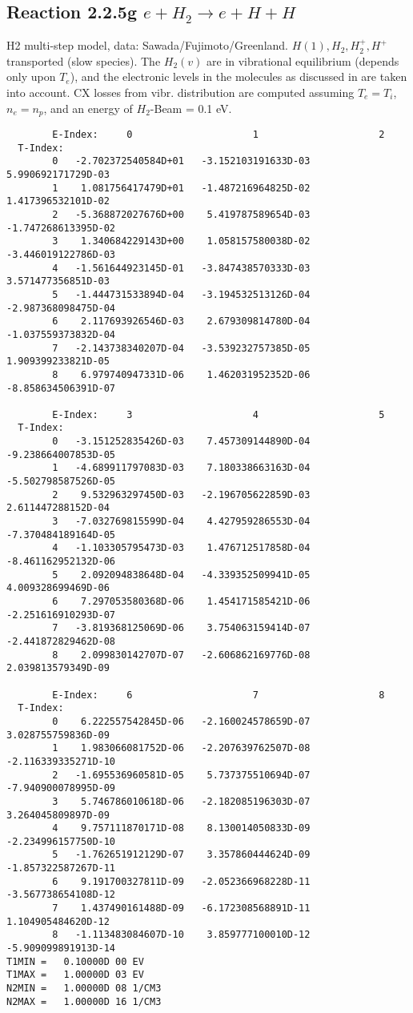 \documentclass[12pt,dvipdfmx]{article}
\begin{document}
\subsection{
Reaction 2.2.5g   $e + H_2   \rightarrow e + H + H  $
}

H2 multi-step model,
data: Sawada/Fujimoto/Greenland.
$  H(1), H_2, H_2^+, H^+ $ transported (slow species).
The $H_2(v)$ are in vibrational equilibrium
(depends only upon $T_e$), and the electronic levels
in the molecules as discussed in \cite{kn:Sawada} are taken into
account. CX losses from vibr. distribution are computed assuming $T_e =
T_i$, $n_e = n_p$, and an energy of $H_2$-Beam  = 0.1 eV.
\begin{small}\begin{verbatim}
        E-Index:     0                     1                     2
  T-Index:
        0   -2.702372540584D+01   -3.152103191633D-03    5.990692171729D-03
        1    1.081756417479D+01   -1.487216964825D-02    1.417396532101D-02
        2   -5.368872027676D+00    5.419787589654D-03   -1.747268613395D-02
        3    1.340684229143D+00    1.058157580038D-02   -3.446019122786D-03
        4   -1.561644923145D-01   -3.847438570333D-03    3.571477356851D-03
        5   -1.444731533894D-04   -3.194532513126D-04   -2.987368098475D-04
        6    2.117693926546D-03    2.679309814780D-04   -1.037559373832D-04
        7   -2.143738340207D-04   -3.539232757385D-05    1.909399233821D-05
        8    6.979740947331D-06    1.462031952352D-06   -8.858634506391D-07

        E-Index:     3                     4                     5
  T-Index:
        0   -3.151252835426D-03    7.457309144890D-04   -9.238664007853D-05
        1   -4.689911797083D-03    7.180338663163D-04   -5.502798587526D-05
        2    9.532963297450D-03   -2.196705622859D-03    2.611447288152D-04
        3   -7.032769815599D-04    4.427959286553D-04   -7.370484189164D-05
        4   -1.103305795473D-03    1.476712517858D-04   -8.461162952132D-06
        5    2.092094838648D-04   -4.339352509941D-05    4.009328699469D-06
        6    7.297053580368D-06    1.454171585421D-06   -2.251616910293D-07
        7   -3.819368125069D-06    3.754063159414D-07   -2.441872829462D-08
        8    2.099830142707D-07   -2.606862169776D-08    2.039813579349D-09

        E-Index:     6                     7                     8
  T-Index:
        0    6.222557542845D-06   -2.160024578659D-07    3.028755759836D-09
        1    1.983066081752D-06   -2.207639762507D-08   -2.116339335271D-10
        2   -1.695536960581D-05    5.737375510694D-07   -7.940900078995D-09
        3    5.746786010618D-06   -2.182085196303D-07    3.264045809897D-09
        4    9.757111870171D-08    8.130014050833D-09   -2.234996157750D-10
        5   -1.762651912129D-07    3.357860444624D-09   -1.857322587267D-11
        6    9.191700327811D-09   -2.052366968228D-11   -3.567738654108D-12
        7    1.437490161488D-09   -6.172308568891D-11    1.104905484620D-12
        8   -1.113483084607D-10    3.859777100010D-12   -5.909099891913D-14
T1MIN =   0.10000D 00 EV
T1MAX =   1.00000D 03 EV
N2MIN =   1.00000D 08 1/CM3
N2MAX =   1.00000D 16 1/CM3


\end{verbatim}
\end{small}
\end{document}
